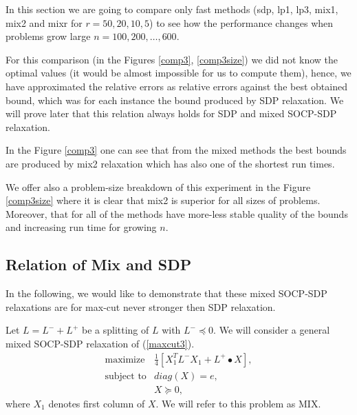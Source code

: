 \documentclass[12pt]{book}
\theoremstyle{definition}
\begin{document}
In this section we are going to compare only fast methods (sdp, lp1, lp3, mix1, mix2 and  mixr for $r=50,20,10,5$) to see how the performance changes when problems grow large $n=100, 200, \dots ,600$.

For this comparison (in the Figures \ref{comp3}, \ref{comp3size}) we did not know the optimal values (it would be almost impossible for us to compute them), hence, we have approximated the relative errors as relative errors against the best obtained bound, which was for each instance the bound produced by SDP relaxation. We will prove later that this relation always holds for SDP and mixed SOCP-SDP relaxation.

In the Figure \ref{comp3} one can see that from the mixed methods the best bounds are produced by mix2 relaxation which has also one of the shortest run times. 


We offer also a problem-size breakdown of this experiment in the Figure \ref{comp3size} where it is clear that mix2 is superior for all sizes of problems. Moreover, that for all of the methods have more-less stable quality of the bounds and increasing run time for growing $n$.


 



\subsection{Relation of Mix and SDP}

In the following, we would like to demonstrate that these mixed SOCP-SDP relaxations are for max-cut never stronger then SDP relaxation. 

Let $L = L^- + L^+$ be a splitting of $L$ with $L^-\preceq 0.$
We will consider a general mixed SOCP-SDP relaxation of (\ref{maxcut3}).
\begin{equation}
\label{MaxCutMixedRelaxGeneral}
\begin{array}{ll}
\mbox{maximize} & \frac{1}{4}\left[ X_1^TL^-X_1 + L^+\bullet X \right], \\
\mbox{subject to} &  diag(X) = e, \\
			& X\succeq 0,
\end{array}
\end{equation}
where $X_1$ denotes first column of $X$. We will refer to this problem as MIX.
\end{document}
